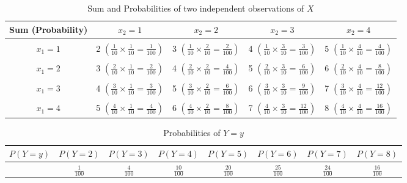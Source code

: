 \begin{subquestions}
\begin{subsubquestions}
\begin{table}[H]
	\centering
	\begin{tabular}{|c|c|c|c|c|}
		\hline
		 Sum (Probability) & $x_2=1$ & $x_2=2$ & $x_2=3$ & $x_2=4$ \\
		\hline 
		& & & &\\
		$x_1=1$ & 2 $\left(\frac{1}{10} \times \frac{1}{10}=\frac{1}{100}\right)$ & 3 $\left(\frac{1}{10} \times \frac{2}{10}=\frac{2}{100}\right)$ & 4 $\left(\frac{1}{10} \times \frac{3}{10}=\frac{3}{100}\right)$ & 5 $\left(\frac{1}{10} \times \frac{4}{10}=\frac{4}{100}\right)$ \\ & & & & \\
		
		$x_1=2$ & 3 $\left(\frac{2}{10} \times \frac{1}{10}=\frac{2}{100}\right)$ & 4 $\left(\frac{2}{10} \times \frac{2}{10}=\frac{4}{100}\right)$ & 5 $\left(\frac{2}{10} \times \frac{3}{10}=\frac{6}{100}\right)$ & 6 $\left(\frac{2}{10} \times \frac{4}{10}=\frac{8}{100}\right)$ \\ & & & & \\
		
		$x_1=3$ & 4 $\left(\frac{3}{10} \times \frac{1}{10}=\frac{3}{100}\right)$ & 5 $\left(\frac{3}{10} \times \frac{2}{10}=\frac{6}{100}\right)$ & 6 $\left(\frac{3}{10} \times \frac{3}{10}=\frac{9}{100}\right)$ & 7 $\left(\frac{3}{10} \times \frac{4}{10}=\frac{12}{100}\right)$ \\ & & & & \\
		
		$x_1=4$ & 5 $\left(\frac{4}{10} \times \frac{1}{10}=\frac{4}{100}\right)$ & 6 $\left(\frac{4}{10} \times \frac{2}{10}=\frac{8}{100}\right)$ & 7 $\left(\frac{4}{10} \times \frac{3}{10}=\frac{12}{100}\right)$ & 8 $\left(\frac{4}{10} \times \frac{4}{10}=\frac{16}{100}\right)$ \\
		\hline
	\end{tabular}
	\caption{\label{2008J:q4:Ytab} Sum and Probabilities of two independent observations of $X$}	
\end{table}


\begin{table}[H]
	\centering
	\begin{tabular}{|c|c|c|c|c|c|c|c|}
		\hline
		$P(Y=y)$ & $P(Y=2)$ &$P(Y=3)$ &$P(Y=4)$ &$P(Y=5)$ &$P(Y=6)$ &$P(Y=7)$ &$P(Y=8)$ \\
		\hline 
		 & $\frac{1}{100}$  &
		 $\frac{4}{100}$  &
		 $\frac{10}{100}$ & 
		 $\frac{20}{100}$  &
		 $\frac{25}{100}$   &
		 $\frac{24}{100}$  &
		$\frac{16}{100}$  \\
		\hline
	\end{tabular}
	\caption{\label{2008J:q4:Ytab2} Probabilities of $Y=y$}	
\end{table}


\end{subsubquestions}
\end{subquestions}
